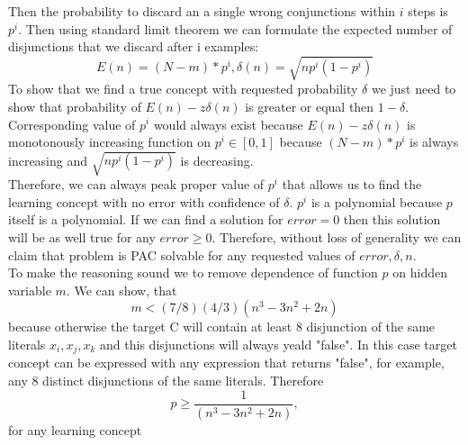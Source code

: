Then the probability to discard an a single wrong conjunctions within $i$ steps is $p^i$. Then using standard limit theorem we can formulate the expected number of disjunctions that we discard after i examples:
\[
E(n) = (N - m)*p^i, \delta(n) = \sqrt{np^i(1-p^i)}
\] 
To show that we find a true concept with requested probability $\delta$ we just need to show that probability of $E(n) - z\delta(n)$ is greater or equal then $1-\delta$. Corresponding value of $p^i$ would always exist because $E(n) - z\delta(n)$ is monotonously increasing function on $p^i \in [0, 1]$ because $(N - m)*p^i$ is always increasing and $\sqrt{np^i(1-p^i)}$ is decreasing.
\[
\]
Therefore, we can always peak proper value of $p^i$ that allows us to find the learning concept with no error with confidence of $\delta$. $p^i$ is a polynomial because $p$ itself is a polynomial. If we can find a solution for $error = 0$ then this solution will be as well true for any $error  \geq 0$. Therefore, without loss of generality we can claim that problem is PAC solvable for any requested values of $error, \delta, n$.
\[
\]
To make the reasoning sound we to remove dependence of function $p$ on hidden variable $m$. We can show, that 
\[
m < (7/8)(4/3)(n^3-3n^2+2n)
\]
because otherwise the target C will contain at least 8 disjunction of the same literals $x_i, x_j, x_k$ and this disjunctions will always yeald "false". In this case target concept can be expressed with any expression that returns "false", for example, any 8 distinct disjunctions of the same literals. Therefore
\[
p \geq \frac{1}{(n^3-3n^2+2n)},
\]
for any learning concept
